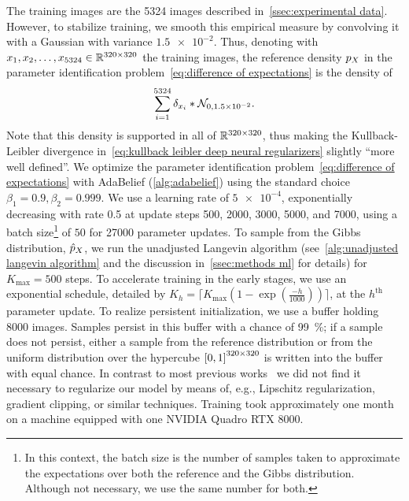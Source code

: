 The training images are the \num{5324} images described in~\cref{ssec:experimental data}.
However, to stabilize training, we smooth this empirical measure by convolving it with a Gaussian with variance \( \num{1.5e-2} \).
Thus, denoting with \( x_{\num{1}}, x_{\num{2}}, \dotsc, x_{\num{5324}} \in \R^{\numproduct{320x320}} \) the training images, the reference density \( p_X \) in the parameter identification problem~\cref{eq:difference of expectations} is the density of
\begin{equation}
	\sum_{i=\num{1}}^{\num{5324}} \delta_{x_i} * \mathcal{N}_{\num{0}, \num{1.5e-2}}.
\end{equation}
Note that this density is supported in all of \( \R^{\numproduct{320x320}} \), thus making the Kullback-Leibler divergence in~\cref{eq:kullback leibler deep neural regularizers} slightly \enquote{more well defined}.
We optimize the parameter identification problem~\cref{eq:difference of expectations} with AdaBelief (\cref{alg:adabelief}) using the standard choice \( \beta_{\num{1}} = \num{0.9}, \beta_{\num{2}} = \num{0.999} \).
We use a learning rate of \( \num{5e-4} \), exponentially decreasing with rate \num{0.5} at update steps \num{500}, \num{2000}, \num{3000}, \num{5000}, and \num{7000}, using a batch size\footnote{
	In this context, the batch size is the number of samples taken to approximate the expectations over both the reference and the Gibbs distribution.
	Although not necessary, we use the same number for both.
} of \( \num{50} \) for \num{27000} parameter updates.
To sample from the Gibbs distribution, \( \hat{p}_{X} \), we run the unadjusted Langevin algorithm (see~\cref{alg:unadjusted langevin algorithm} and the discussion in~\cref{ssec:methods ml} for details) for \( K_{\text{max}} = \num{500} \) steps.
To accelerate training in the early stages, we use an exponential schedule, detailed by \( K_h = \lceil K_{\text{max}} (1 - \exp(\frac{-h}{\num{1000}})) \rceil \), at the \( h^{\text{th}} \) parameter update.
To realize persistent initialization, we use a buffer holding \num{8000} images.
Samples persist in this buffer with a chance of \qty{99}{\percent};
if a sample does not persist, either a sample from the reference distribution or from the uniform distribution over the hypercube \( \interval{\num{0}}{\num{1}}^{\numproduct{320x320}} \) is written into the buffer with equal chance.
In contrast to most previous works~\cite{du_implicit_2019,Guan_energy_2022,tu_collaborative_2023} we did not find it necessary to regularize our model by means of, e.g., Lipschitz regularization, gradient clipping, or similar techniques.
Training took approximately one month on a machine equipped with one NVIDIA Quadro RTX 8000.
